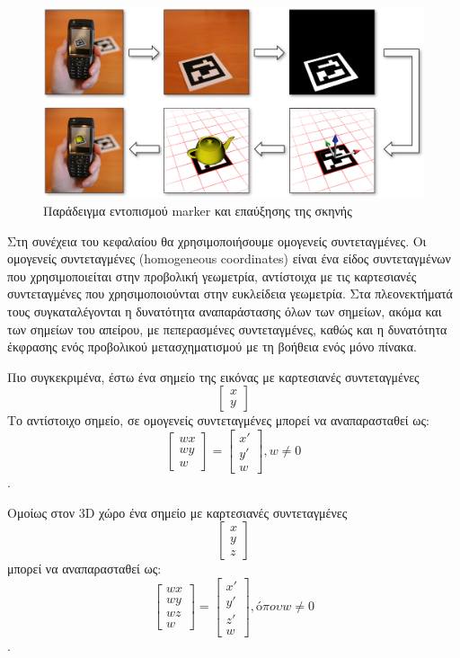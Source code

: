 \begin{figure}[H]
    \centering
    \includegraphics[scale=0.5, angle=0]{Files/Figures/HowMarkersWork.jpg}
    \caption[Παράδειγμα εντοπισμού marker και επαύξησης της σκηνής]{ Παράδειγμα εντοπισμού marker και επαύξησης της σκηνής \cite{howmarkerswork}}
    \label{fig:howmarkerswork}
\end{figure}


Στη συνέχεια του κεφαλαίου θα χρησιμοποιήσουμε ομογενείς συντεταγμένες. Οι ομογενείς συντεταγμένες (homogeneous coordinates) είναι ένα είδος συντεταγμένων που χρησιμοποιείται στην προβολική γεωμετρία, αντίστοιχα με τις καρτεσιανές συντεταγμένες που χρησιμοποιούνται στην ευκλείδεια γεωμετρία. Στα πλεονεκτήματά τους συγκαταλέγονται η δυνατότητα αναπαράστασης όλων των σημείων, ακόμα και των σημείων του απείρου, με πεπερασμένες συντεταγμένες, καθώς και η δυνατότητα έκφρασης ενός προβολικού μετασχηματισμού με τη βοήθεια ενός μόνο πίνακα.


Πιο συγκεκριμένα, έστω ένα σημείο της εικόνας με καρτεσιανές συντεταγμένες \[\begin{bmatrix} x \\ y \end{bmatrix}\]
Το αντίστοιχο σημείο, σε ομογενείς συντεταγμένες μπορεί να αναπαρασταθεί ως: \[\begin{bmatrix} wx \\ wy \\ w\end{bmatrix}=
\begin{bmatrix}x'\\y'\\w\end{bmatrix} , w\neq0 \].

Ομοίως στον 3D χώρο ένα σημείο με καρτεσιανές συντεταγμένες \[\begin{bmatrix} x \\ y \\ z \end{bmatrix}\] μπορεί να αναπαρασταθεί ως: \[\begin{bmatrix} wx \\ wy \\ wz \\ w\end{bmatrix}=
\begin{bmatrix}x'\\y'\\z' \\ w\end{bmatrix} , όπου w\neq0 \].


